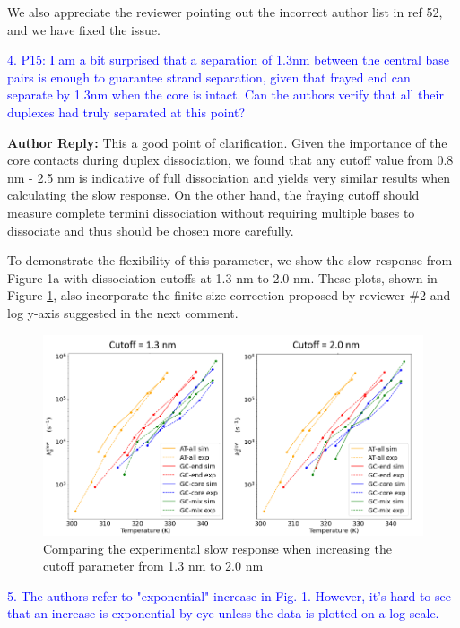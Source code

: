 \documentclass[11pt,a4paper]{letter} %
\begin{document}
We also appreciate the reviewer pointing out the incorrect author list in ref 52, and we have fixed the issue.

\textcolor{blue}{4. P15: I am a bit surprised that a separation of 1.3nm between the central base pairs is enough to guarantee strand separation, given that frayed end can separate by 1.3nm when the core is intact. Can the authors verify that all their duplexes had truly separated at this point?}

\textbf{Author Reply:}   This a good point of clarification. Given the importance of the core contacts during duplex dissociation, we found that any cutoff value from 0.8 nm - 2.5 nm is indicative of full dissociation and yields very similar results when calculating the slow response. On the other hand, the fraying cutoff should measure complete termini dissociation without requiring multiple bases to dissociate and thus should be chosen more carefully. 

To demonstrate the flexibility of this parameter, we show the slow response from Figure 1a with dissociation cutoffs at 1.3 nm to 2.0 nm. These plots, shown in Figure \ref{fig:compare_cutoffs}, also incorporate the finite size correction proposed by reviewer \#2 and log y-axis suggested in the next comment.

\begin{figure}[ht!]
	\begin{center}
        \includegraphics[width=\textwidth]{cover_letter/revision_figures/slow_response_compare_cutoff.png}
        \caption{Comparing the experimental slow response when increasing the cutoff parameter from 1.3 nm to 2.0 nm}
        \label{fig:compare_cutoffs}
	\end{center}
\end{figure}

\textcolor{blue}{5. The authors refer to "exponential" increase in Fig. 1. However, it's hard to see that an increase is exponential by eye unless the data is plotted on a log scale.}
\end{document}
